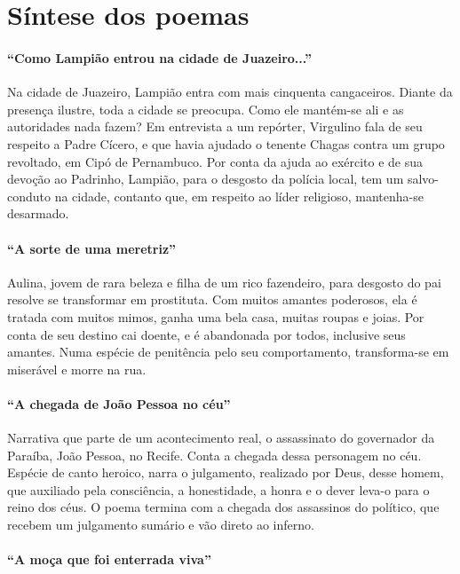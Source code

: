 \pagebreak
\section{Síntese dos poemas}

\paragraph{``Como Lampião entrou na cidade de
Juazeiro...''}

Na cidade de Juazeiro, Lampião entra com mais cinquenta cangaceiros. Diante da
presença ilustre, toda a cidade se preocupa. Como ele mantém-se ali e as
autoridades nada fazem? Em entrevista a um repórter, Virgulino fala de
seu respeito a Padre Cícero, e que havia ajudado o tenente Chagas
contra um grupo revoltado, em Cipó de Pernambuco. Por conta da ajuda ao
exército e de sua devoção ao Padrinho, Lampião, para o desgosto da
polícia local, tem um salvo-conduto na cidade, contanto que, em respeito
ao líder religioso, mantenha-se desarmado. 

\paragraph{``A sorte de uma meretriz''}

Aulina, jovem de rara beleza e filha de um rico fazendeiro, para
desgosto do pai resolve se transformar em prostituta. Com muitos
amantes poderosos, ela é tratada com muitos mimos, ganha uma bela casa,
muitas roupas e joias. Por conta de seu destino cai doente, e é
abandonada por todos, inclusive seus amantes. Numa espécie de
penitência pelo seu comportamento, transforma-se em miserável e morre
na rua. 

\paragraph{``A chegada de João Pessoa no céu''}

Narrativa que parte de um acontecimento real, o assassinato do
governador da Paraíba, João Pessoa, no Recife. Conta a chegada dessa
personagem no céu. Espécie de canto heroico, narra o julgamento, realizado por Deus, desse
homem, que auxiliado pela consciência, a
honestidade, a honra e o dever leva-o para o reino dos céus. O poema
termina com a chegada dos assassinos do político, que recebem um
julgamento sumário e vão direto ao inferno. 

\paragraph{``A moça que foi enterrada viva''}

